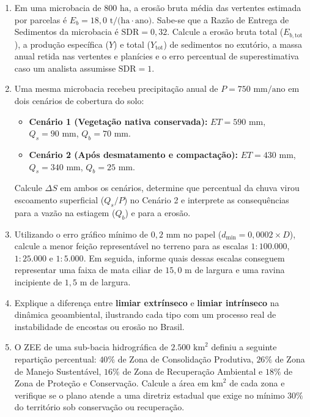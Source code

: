 \begin{enumerate}[leftmargin=1.8em, itemsep=4pt, resume]
  \item Em uma microbacia de $800\text{ ha}$, a erosão bruta média das vertentes estimada por parcelas é $E_b = 18{,}0\text{ t/(ha}\cdot\text{ano)}$. Sabe-se que a Razão de Entrega de Sedimentos da microbacia é $\text{SDR} = 0{,}32$. Calcule a erosão bruta total ($E_{b,\text{tot}}$), a produção específica ($Y$) e total ($Y_{\text{tot}}$) de sedimentos no exutório, a massa anual retida nas vertentes e planícies e o erro percentual de superestimativa caso um analista assumisse $\text{SDR} = 1$.
  \espacoResolucao[2.8cm]

  \item Uma mesma microbacia recebeu precipitação anual de $P = 750\text{ mm/ano}$ em dois cenários de cobertura do solo:
  \begin{itemize}[leftmargin=1.4em, itemsep=1pt]
    \item \textbf{Cenário 1 (Vegetação nativa conservada):} $ET = 590\text{ mm}$, $Q_s = 90\text{ mm}$, $Q_b = 70\text{ mm}$.
    \item \textbf{Cenário 2 (Após desmatamento e compactação):} $ET = 430\text{ mm}$, $Q_s = 340\text{ mm}$, $Q_b = 25\text{ mm}$.
  \end{itemize}
  Calcule $\Delta S$ em ambos os cenários, determine que percentual da chuva virou escoamento superficial ($Q_s/P$) no Cenário 2 e interprete as consequências para a vazão na estiagem ($Q_b$) e para a erosão.
  \espacoResolucao[2.8cm]

  \item Utilizando o erro gráfico mínimo de $0{,}2\text{ mm}$ no papel ($d_{\min} = 0{,}0002 \times D$), calcule a menor feição representável no terreno para as escalas $1{:}100.000$, $1{:}25.000$ e $1{:}5.000$. Em seguida, informe quais dessas escalas conseguem representar uma faixa de mata ciliar de $15{,}0\text{ m}$ de largura e uma ravina incipiente de $1{,}5\text{ m}$ de largura.
  \espacoResolucao[2.5cm]

  \item Explique a diferença entre \textbf{limiar extrínseco} e \textbf{limiar intrínseco} na dinâmica geoambiental, ilustrando cada tipo com um processo real de instabilidade de encostas ou erosão no Brasil.
  \espacoResolucao[2.2cm]

  \item O ZEE de uma sub-bacia hidrográfica de $2.500\text{ km}^2$ definiu a seguinte repartição percentual: $40\%$ de Zona de Consolidação Produtiva, $26\%$ de Zona de Manejo Sustentável, $16\%$ de Zona de Recuperação Ambiental e $18\%$ de Zona de Proteção e Conservação. Calcule a área em $\text{km}^2$ de cada zona e verifique se o plano atende a uma diretriz estadual que exige no mínimo $30\%$ do território sob conservação ou recuperação.
  \espacoResolucao[2.4cm]
\end{enumerate}

